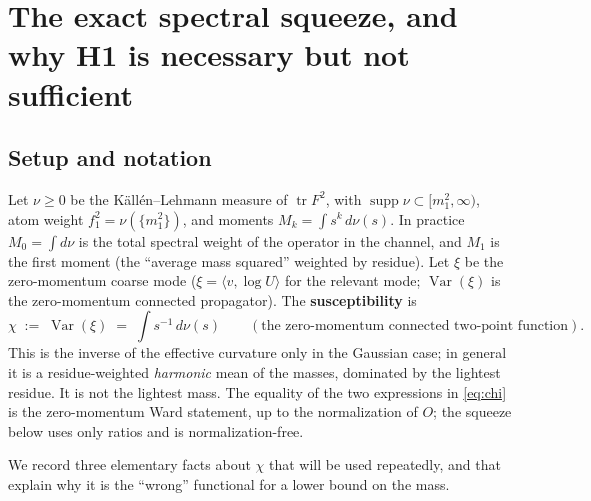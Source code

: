 \section{The exact spectral squeeze, and why H1 is necessary but not sufficient}

\figladder
\label{sec:squeeze}

\subsection{Setup and notation}

Let $\nu\ge0$ be the K\"all\'en--Lehmann measure of $\operatorname{tr}F^2$, with
$\operatorname{supp}\nu\subset[m_1^2,\infty)$, atom weight $f_1^2=\nu(\{m_1^2\})$, and moments
$M_k=\int s^k\,d\nu(s)$. In practice $M_0=\int d\nu$ is the total spectral weight of the
operator in the channel, and $M_1$ is the first moment (the ``average mass squared'' weighted by
residue). Let $\xi$ be the zero-momentum coarse mode
($\xi=\langle v,\log U\rangle$ for the relevant mode; $\operatorname{Var}(\xi)$ is the
zero-momentum connected propagator). The \textbf{susceptibility} is
\begin{equation}
\chi \;:=\; \operatorname{Var}(\xi) \;=\; \int s^{-1}\,d\nu(s)
\qquad(\text{the zero-momentum connected two-point function}).
\label{eq:chi}
\end{equation}
This is the inverse of the effective curvature only in the Gaussian case; in general it is a
residue-weighted \emph{harmonic} mean of the masses, dominated by the lightest residue. It is
not the lightest mass. The equality of the two expressions in \eqref{eq:chi} is the
zero-momentum Ward statement, up to the normalization of $O$; the squeeze below uses only ratios
and is normalization-free.

We record three elementary facts about $\chi$ that will be used repeatedly, and that explain why
it is the ``wrong'' functional for a lower bound on the mass.

